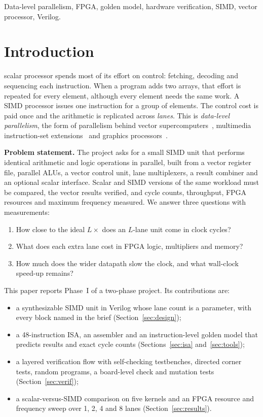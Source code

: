 \documentclass[journal]{IEEEtran}
\newcommand{\x}{\ensuremath{\times}}
\begin{document}
\begin{IEEEkeywords}
Data-level parallelism, FPGA, golden model, hardware verification, SIMD, vector
processor, Verilog.
\end{IEEEkeywords}

\section{Introduction}

 scalar processor spends most of its effort on control: fetching,
decoding and sequencing each instruction. When a program adds two arrays, that effort
is repeated for every element, although every element needs the same work. A SIMD
processor issues one instruction for a group of elements. The control cost is paid
once and the arithmetic is replicated across \emph{lanes}. This is
\emph{data-level parallelism}, the form of parallelism behind vector
supercomputers~\cite{cray1}, multimedia instruction-set extensions~\cite{mmx} and
graphics processors~\cite{hp6}.

\textbf{Problem statement.} The project asks for a small SIMD unit that performs
identical arithmetic and logic operations in parallel, built from a vector register
file, parallel ALUs, a vector control unit, lane multiplexers, a result combiner and
an optional scalar interface. Scalar and SIMD versions of the same workload must be
compared, the vector results verified, and cycle counts, throughput, FPGA resources
and maximum frequency measured. We answer three questions with measurements:
\begin{enumerate}
\item How close to the ideal $L\x$ does an $L$-lane unit come in clock cycles?
\item What does each extra lane cost in FPGA logic, multipliers and memory?
\item How much does the wider datapath slow the clock, and what wall-clock speed-up
      remains?
\end{enumerate}

This paper reports Phase~I of a two-phase project. Its contributions are:
\begin{itemize}
\item a synthesizable SIMD unit in Verilog whose lane count is a parameter, with every
      block named in the brief (Section~\ref{sec:design});
\item a 48-instruction ISA, an assembler and an instruction-level golden model that
      predicts results and exact cycle counts (Sections~\ref{sec:isa}
      and~\ref{sec:tools});
\item a layered verification flow with self-checking testbenches, directed corner
      tests, random programs, a board-level check and mutation tests
      (Section~\ref{sec:verif});
\item a scalar-versus-SIMD comparison on five kernels and an FPGA resource and
      frequency sweep over 1, 2, 4 and 8 lanes (Section~\ref{sec:results}).
\end{itemize}
\end{document}
